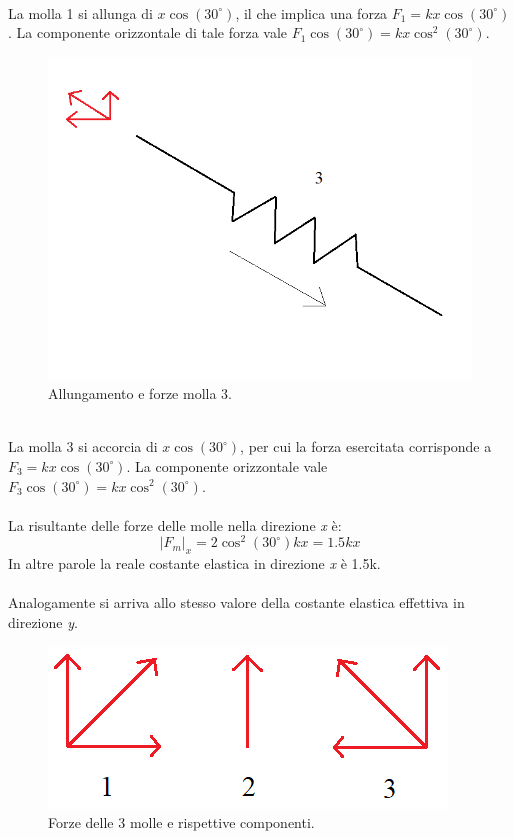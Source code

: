 \\
La molla 1 si allunga di $x\cos(30^\circ)$, il che implica una forza $F_{1}=k x\cos(30^\circ)$. La componente orizzontale di tale forza vale $F_{1}\cos(30^\circ)=k x\cos^2(30^\circ)$.
\\
\begin{figure}[h]
    \centering
    \includegraphics[scale=0.4]{Molla 3.png}
    \caption{Allungamento e forze molla 3.}
    \label{Molla3}
\end{figure}
\\
La molla 3 si accorcia di $x\cos(30^\circ)$, per cui la forza esercitata corrisponde a $F_{3}=k x\cos(30^\circ)$. La componente orizzontale vale $F_{3}\cos(30^\circ)=k x\cos^2(30^\circ)$.
\\\\
La risultante delle forze delle molle nella direzione \textit {x} è:
\begin{equation}
    |F_m|_x=2\cos^2(30^{\circ})k x=1.5k x
\end{equation}
In altre parole la reale costante elastica in direzione \textit {x} è 1.5k.
\\\\
Analogamente si arriva allo stesso valore della costante elastica effettiva in direzione \textit {y}.
\\
\begin{figure}[h]
    \centering
    \includegraphics[scale=0.6]{TreForze.png}
    \caption{Forze delle 3 molle e rispettive componenti.}
    \label{TreForze}
\end{figure}
